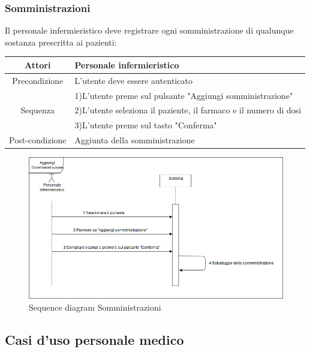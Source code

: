 \documentclass[a4paper]{report}
\begin{document}
        \newpage
        \subsubsection{Somministrazioni}
            Il personale infermieristico deve registrare ogni somministrazione di qualunque sostanza prescritta ai pazienti:
            \begin{table}[htbp]
                    \begin{tabular}{|c|l|}
                        \hline
                        Attori & Personale infermieristico \\\hline
                    Precondizione & L'utente deve essere autenticato \\\hline
                     & 1)L'utente preme sul pulsante "Aggiungi somministrazione" \\
                    Sequenza & 2)L'utente seleziona il paziente, il farmaco e il numero di dosi \\
                      & 3)L'utente preme sul tasto "Conferma" \\\hline
                    Post-condizione & Aggiunta della somministrazione  \\\hline
                    \end{tabular}
                \end{table}
            \begin{figure}[htbp]
                \centering
                \includegraphics[scale=0.4]{InsSom.png}
                \caption{Sequence diagram Somministrazioni}
            \end{figure}
            
        \newpage
        \subsection{Casi d'uso personale medico}
\end{document}
